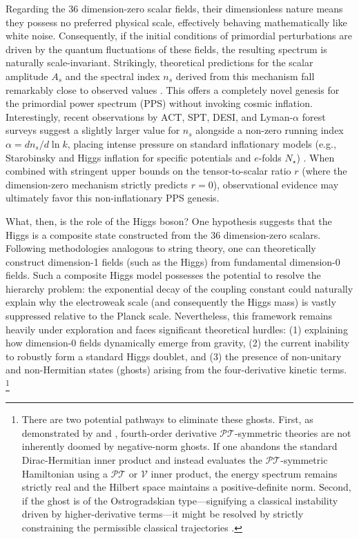 \documentclass[12pt,a4paper]{report}
\let\cite\parencite
\begin{document}
Regarding the 36 dimension-zero scalar fields, their dimensionless nature means they possess no preferred physical scale, effectively behaving mathematically like white noise. Consequently, if the initial conditions of primordial perturbations are driven by the quantum fluctuations of these fields, the resulting spectrum is naturally scale-invariant. Strikingly, theoretical predictions for the scalar amplitude $A_s$ and the spectral index $n_s$ derived from this mechanism fall remarkably close to observed values \cite{2023arXiv230200344T}. This offers a completely novel genesis for the primordial power spectrum (PPS) without invoking cosmic inflation. Interestingly, recent observations by ACT, SPT, DESI, and Lyman-$\alpha$ forest surveys suggest a slightly larger value for $n_s$ alongside a non-zero running index $\alpha=dn_s/d\ln k$, placing intense pressure on standard inflationary models (e.g., Starobinsky and Higgs inflation for specific potentials and $e$-folds $N_\star$) \cite{Balkenhol2025, mcdonough2026spectrumnsconstraintsdesi, pwfl-mt4g}. When combined with stringent upper bounds on the tensor-to-scalar ratio $r$ \cite{PhysRevD.105.083524} (where the dimension-zero mechanism strictly predicts $r=0$), observational evidence may ultimately favor this non-inflationary PPS genesis.

What, then, is the role of the Higgs boson? One hypothesis suggests that the Higgs is a composite state constructed from the 36 dimension-zero scalars. Following methodologies analogous to string theory, one can theoretically construct dimension-1 fields (such as the Higgs) from fundamental dimension-0 fields. Such a composite Higgs model possesses the potential to resolve the hierarchy problem: the exponential decay of the coupling constant could naturally explain why the electroweak scale (and consequently the Higgs mass) is vastly suppressed relative to the Planck scale. Nevertheless, this framework remains heavily under exploration and faces significant theoretical hurdles: (1) explaining how dimension-0 fields dynamically emerge from gravity, (2) the current inability to robustly form a standard Higgs doublet, and (3) the presence of non-unitary and non-Hermitian states (ghosts) arising from the four-derivative kinetic terms. \footnote{There are two potential pathways to eliminate these ghosts. First, as demonstrated by \citet{Bender:2007wu} and \cite{PhysRevD.97.045001}, fourth-order derivative $\mathcal{PT}$-symmetric theories are not inherently doomed by negative-norm ghosts. If one abandons the standard Dirac-Hermitian inner product and instead evaluates the $\mathcal{PT}$-symmetric Hamiltonian using a $\mathcal{PT}$ or $\mathcal{V}$ inner product, the energy spectrum remains strictly real and the Hilbert space maintains a positive-definite norm. Second, if the ghost is of the Ostrogradskian type---signifying a classical instability driven by higher-derivative terms---it might be resolved by strictly constraining the permissible classical trajectories \cite{Chen:2012au}.}
\end{document}

